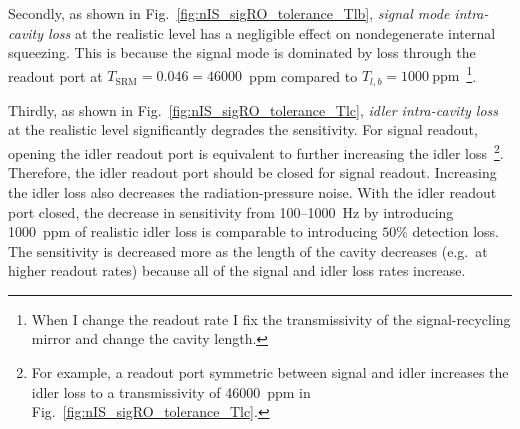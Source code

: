 Secondly, as shown in Fig.~\ref{fig:nIS_sigRO_tolerance_Tlb}, \emph{signal mode intra-cavity loss} at the realistic level has a negligible effect on nondegenerate internal squeezing. This is because the signal mode is dominated by loss through the readout port at $T_\text{SRM}=0.046=46000$~ppm compared to $T_{l,b}=1000~\text{ppm}$~\footnote{When I change the readout rate I fix the transmissivity of the signal-recycling mirror and change the cavity length.}. %

Thirdly, as shown in Fig.~\ref{fig:nIS_sigRO_tolerance_Tlc}, \emph{idler intra-cavity loss} at the realistic level significantly degrades the sensitivity. For signal readout, opening the idler readout port is equivalent to further increasing the idler loss~\footnote{For example, a readout port symmetric between signal and idler increases the idler loss to a transmissivity of 46000~ppm in Fig.~\ref{fig:nIS_sigRO_tolerance_Tlc}.}. Therefore, the idler readout port should be closed for signal readout. Increasing the idler loss also decreases the radiation-pressure noise. With the idler readout port closed, the decrease in sensitivity from 100--1000~Hz by introducing 1000~ppm of realistic idler loss is comparable to introducing $50\%$ detection loss. The sensitivity is decreased more as the length of the cavity decreases (e.g.\ at higher readout rates) because all of the signal and idler loss rates increase. 

